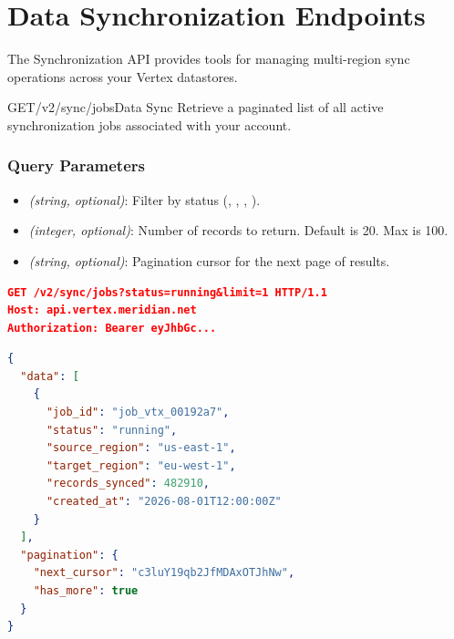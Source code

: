 \section{Data Synchronization Endpoints}
\label{sec:endpoints}
The Synchronization API provides tools for managing multi-region sync operations across your Vertex datastores.

\begin{apiendpoint}{GET}{/v2/sync/jobs}{Data Sync}
Retrieve a paginated list of all active synchronization jobs associated with your account.
\end{apiendpoint}

\subsubsection{Query Parameters}
\begin{itemize}
  \item {} \textit{(string, optional)}: Filter by status (, , , ).
  \item {} \textit{(integer, optional)}: Number of records to return. Default is 20. Max is 100.
  \item {} \textit{(string, optional)}: Pagination cursor for the next page of results.
\end{itemize}

\noindent
\begin{minipage}[t]{0.48\linewidth}
  \begin{tcolorbox}[codeboxstyle, title={Request Headers}]
\begin{lstlisting}[language=json,numbers=none]
GET /v2/sync/jobs?status=running&limit=1 HTTP/1.1
Host: api.vertex.meridian.net
Authorization: Bearer eyJhbGc...
\end{lstlisting}
  \end{tcolorbox}
\end{minipage}
\hfill
\begin{minipage}[t]{0.48\linewidth}
  \begin{tcolorbox}[codeboxstyle, title={Response Payload}]
\begin{lstlisting}[language=json]
{
  "data": [
    {
      "job_id": "job_vtx_00192a7",
      "status": "running",
      "source_region": "us-east-1",
      "target_region": "eu-west-1",
      "records_synced": 482910,
      "created_at": "2026-08-01T12:00:00Z"
    }
  ],
  "pagination": {
    "next_cursor": "c3luY19qb2JfMDAxOTJhNw",
    "has_more": true
  }
}
\end{lstlisting}
  \end{tcolorbox}
\end{minipage}


